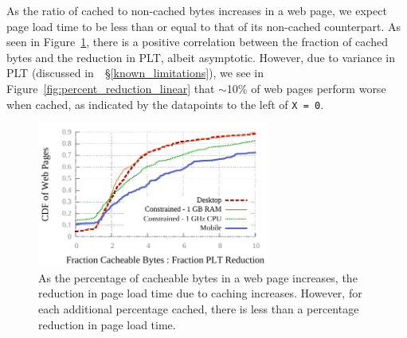 As the ratio of cached to non-cached bytes increases in a web page, we expect page load time to be less than or equal to that of its non-cached counterpart. As seen in Figure~\ref{fig:ratio_linear_comparison}, there is a positive correlation between the fraction of cached bytes and the reduction in PLT, albeit asymptotic.
However, due to variance in PLT (discussed in~~\S\ref{known_limitations}), we
see in Figure~\ref{fig:percent_reduction_linear} that
{\footnotesize$\sim$}10\% of web pages perform worse when cached, as
indicated by the datapoints to the left of \texttt{X = 0}.
\begin{figure}[t]
    \includegraphics[width=3in]{../graphs/ratio_bytes_to_reduction/ratio_linear_comparison.pdf}
    \caption[]{\label{fig:ratio_linear_comparison}As the percentage of cacheable bytes in a web page increases, the reduction in page load time due to caching increases. However, for each additional percentage cached, there is less than a percentage reduction in page load time.}
\end{figure}
